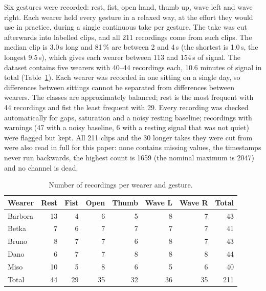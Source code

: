 \documentclass[conference]{IEEEtran}
\begin{document}
Six gestures were recorded: rest, fist, open hand, thumb up, wave left and wave
right. Each wearer held every gesture in a relaxed way, at the effort they
would use in practice, during a single continuous take per gesture. The take
was cut afterwards into labelled clips, and all 211 recordings come from such
clips. The median clip is 3.0\,s long and 81\,\% are between 2 and 4\,s
(the shortest is 1.0\,s, the longest 9.5\,s), which gives each wearer between
113 and 154\,s of signal. The dataset contains five wearers with 40--44
recordings each, 10.6 minutes of signal in total (Table~\ref{tab:dataset}).
Each wearer was recorded in one sitting on a single day, so differences
between sittings cannot be separated from differences between wearers. The
classes are approximately balanced; rest is the most frequent with 44
recordings and fist the least frequent with 29. Every recording was checked
automatically for gaps, saturation and a noisy resting baseline; recordings
with warnings (47 with a noisy baseline, 6 with a resting signal that was not
quiet) were flagged but kept. All 211 clips and the 30 longer takes they were
cut from were also read in full for this paper: none contains missing values,
the timestamps never run backwards, the highest count is 1659 (the
nominal maximum is 2047) and no channel is dead.

\begin{table}[!t]
\centering
\caption{Number of recordings per wearer and gesture.}
\label{tab:dataset}
\footnotesize
\setlength{\tabcolsep}{3.5pt}
\begin{tabular}{lrrrrrrr}
\toprule
Wearer & Rest & Fist & Open & Thumb & Wave L & Wave R & Total \\
\midrule
Barbora & 13 & 4 & 6 & 5 & 8 & 7 & 43 \\
Betka   & 7  & 6 & 7 & 7 & 7 & 7 & 41 \\
Bruno   & 8  & 7 & 7 & 6 & 8 & 7 & 43 \\
Dano    & 6  & 7 & 7 & 8 & 8 & 8 & 44 \\
Miso    & 10 & 5 & 8 & 6 & 5 & 6 & 40 \\
\midrule
Total   & 44 & 29 & 35 & 32 & 36 & 35 & 211 \\
\bottomrule
\end{tabular}
\end{table}
\end{document}
